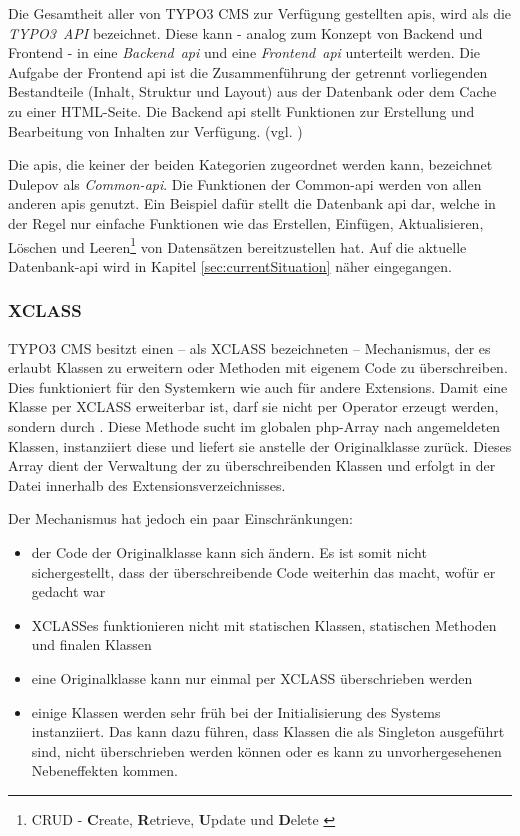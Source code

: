Die Gesamtheit aller von TYPO3 CMS zur Verfügung gestellten \gls{api}s, wird als die \mbox{\textit{TYPO3 API}} bezeichnet. Diese kann - analog zum Konzept von Backend und Frontend - in eine \mbox{\textit{Backend \gls{api}}} und eine \mbox{\textit{Frontend \gls{api}}} unterteilt werden. Die Aufgabe der Frontend \gls{api} ist die Zusammenführung der getrennt vorliegenden Bestandteile (Inhalt, Struktur und Layout) aus der Datenbank oder dem Cache zu einer HTML-Seite. Die Backend \gls{api} stellt Funktionen zur Erstellung und Bearbeitung von Inhalten zur Verfügung. (vgl. \cite[S. 5 ff.]{book:dulepovTypo32008})

Die \gls{api}s, die keiner der beiden Kategorien zugeordnet werden kann, bezeichnet Dulepov \cite[S. 5 ff.]{book:dulepovTypo32008} als \mbox{\textit{Common-\gls{api}}}. Die Funktionen der Common-\gls{api} werden von allen anderen \gls{api}s genutzt. Ein Beispiel dafür stellt die Datenbank \gls{api} dar, welche in der Regel nur einfache Funktionen wie das Erstellen, Einfügen, Aktualisieren, Löschen und Leeren\footnote{CRUD - {\bfseries C}reate, {\bfseries R}etrieve, {\bfseries U}pdate und {\bfseries D}elete \label{ft:crud}} von Datensätzen bereitzustellen hat. Auf die aktuelle Datenbank-\gls{api} wird in Kapitel \ref{sec:currentSituation} näher eingegangen.

\subsubsection{XCLASS}
TYPO3 CMS besitzt einen – als XCLASS bezeichneten – Mechanismus, der es erlaubt Klassen zu erweitern oder Methoden mit eigenem Code zu überschreiben. Dies funktioniert für den Systemkern wie auch für andere Extensions. Damit eine Klasse per XCLASS erweiterbar ist, darf sie nicht per  Operator erzeugt werden, sondern durch .
Diese Methode sucht im globalen \gls{php}-Array  nach angemeldeten Klassen, instanziiert diese und liefert sie anstelle der Originalklasse zurück. Dieses Array dient der Verwaltung der zu überschreibenden Klassen und erfolgt in der Datei  innerhalb des Extensionsverzeichnisses.

Der Mechanismus hat jedoch ein paar Einschränkungen:

\begin{itemize}
	\itemsep1pt\parskip0pt
	\item
		der Code der Originalklasse kann sich ändern. Es ist somit nicht sichergestellt, dass der überschreibende Code weiterhin das macht, wofür er gedacht war
	\item
		XCLASSes funktionieren nicht mit statischen Klassen, statischen Methoden und finalen Klassen
	\item
		eine Originalklasse kann nur einmal per XCLASS überschrieben werden
	\item
		einige Klassen werden sehr früh bei der Initialisierung des Systems instanziiert. Das kann dazu führen, dass Klassen die als Singleton ausgeführt sind, nicht überschrieben werden können oder es kann zu unvorhergesehenen Nebeneffekten kommen.
\end{itemize}

